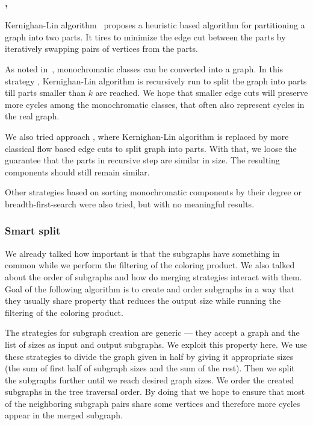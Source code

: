 
\subsubsection{\KernighanLin{}, \Cuts{}}

Kernighan-Lin algorithm~\cite{kernighan_lin} proposes a heuristic based algorithm
for partitioning a graph into two parts. It tires to minimize the edge cut between
the parts by iteratively swapping pairs of vertices from the parts.

As noted in~,
monochromatic classes can be converted into a graph.
In this strategy \KernighanLin{},
Kernighan-Lin algorithm is recursively run to split the graph into parts till
parts smaller than \( k \) are reached.
We hope that smaller edge cuts will preserve more cycles among
the monochromatic classes, that often also represent cycles in the real graph.

We also tried approach \Cuts{}, where Kernighan-Lin algorithm is replaced by
more classical flow based edge cuts to split graph into parts.
With that, we loose the guarantee that the parts in recursive step
are similar in size. The resulting components should still remain similar.

Other strategies based on
sorting monochromatic components by their degree
or breadth-first-search were also tried,
but with no meaningful results.

\subsubsection{Smart split}%
\label{sec:smart_split}

We already talked how important is that the subgraphs have something in common
while we perform the filtering of the coloring product. We also talked about the order of
subgraphs and how do merging strategies interact with them.
Goal of the following algorithm is to create and order subgraphs in a way that they usually
share property that reduces the output size while running
the filtering of the coloring product.

The strategies for subgraph creation are generic --- they accept a graph and
the list of sizes as input and output subgraphs. We exploit this property here. We use
these strategies to divide the graph given in half by giving it appropriate
sizes (the sum of first half of subgraph sizes and the sum of the rest).
Then we split the subgraphs further until we reach desired graph sizes.
We order the created subgraphs in the tree traversal order.
By doing that we hope to ensure that most of the neighboring subgraph pairs share
some vertices and therefore more cycles appear in the merged subgraph.

